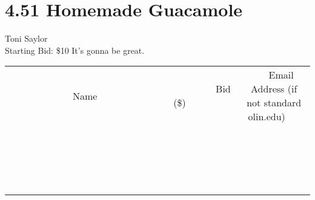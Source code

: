 \documentclass[11pt]{article}
\begin{document}
\section*{4.51 Homemade Guacamole}
Toni Saylor
\\
Starting Bid: \$10
\newline
It's gonna be great.
\\[3ex]
\begin{tabular}{c c c}
~~~~~~~~~~~~~Name~~~~~~~~~~~~~ & ~~~~~~~~~Bid (\$)~~~~~~~~~  & ~~~Email Address (if not standard olin.edu)~~~\\
 & & \\
\hline
 & & \\
\hline
 & & \\
\hline
 & & \\
\hline
 & & \\
\hline
 & & \\
\hline
 & & \\
\hline
 & & \\
\hline
 & & \\
\hline
 & & \\
\hline
 & & \\
\hline
 & & \\
\hline
 & & \\
\hline
 & & \\
\hline
 & & \\
\hline
 & & \\
\hline
 & & \\
\hline
 & & \\
\hline
 & & \\
\hline
\end{tabular}
\newpage
\end{document}
